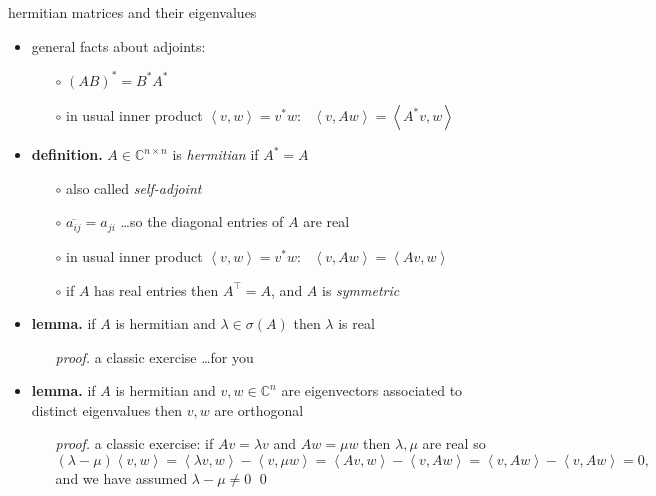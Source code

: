 \documentclass[10pt,hyperref]{beamer}
\newcommand{\CC}{\mathbb{C}}
\newcommand{\ip}[2]{\left<#1,#2\right>}
\newcommand{\bqed}{{\color{blue}\qed}}
\begin{document}
\begin{frame}{hermitian matrices and their eigenvalues}

\begin{itemize}
\item general facts about adjoints:
    \begin{itemize}
    \item[$\circ$] $(AB)^*=B^*A^*$
    \item[$\circ$] in usual inner product $\ip{v}{w}=v^*w$: \, $\ip{v}{Aw} = \ip{A^* v}{w}$
    \end{itemize}
\item \textbf{definition.} $A \in \CC^{n\times n}$ is \emph{hermitian} if $A^*=A$
    \begin{itemize}
    \item[$\circ$] also called \emph{self-adjoint}
    \item[$\circ$] $\overline{a_{ij}} = a_{ji}$ \dots so the diagonal entries of $A$ are real
    \item[$\circ$] in usual inner product $\ip{v}{w}=v^*w$: \, $\ip{v}{Aw} = \ip{A v}{w}$
    \item[$\circ$] if $A$ has real entries then $A^\top=A$, and $A$ is \emph{symmetric}
    \end{itemize}
\item \textbf{lemma.} if $A$ is hermitian and $\lambda \in \sigma(A)$ then $\lambda$ is real
    \begin{itemize}
    \item[\emph{proof.}] a classic exercise \dots for you
    \end{itemize}
\item \textbf{lemma.} if $A$ is hermitian and $v,w \in \CC^n$ are eigenvectors associated to distinct eigenvalues then $v,w$ are orthogonal
    \begin{itemize}
    \item[\emph{proof.}] a classic exercise: if $Av=\lambda v$ and $Aw=\mu w$ then $\lambda,\mu$ are real so
    $$(\lambda-\mu) \ip{v}{w} = \ip{\lambda v}{w} - \ip{v}{\mu w} = \ip{Av}{w} - \ip{v}{Aw} = \ip{v}{Aw} - \ip{v}{Aw} = 0,$$
and we have assumed $\lambda-\mu \ne 0$ \bqed
    \end{itemize}
\end{itemize}
\end{frame}
\end{document}
